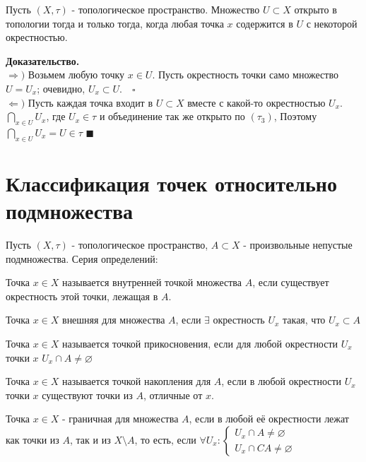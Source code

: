 \begin{theorem}
    Пусть $(X,\tau)$ - топологическое пространство. Множество $U{\subset}X$ открыто в топологии тогда и только тогда, когда любая точка $x$ содержится в $U$ с некоторой окрестностью. 

\textbf{Доказательство.}\\ $\Rightarrow)$ Возьмем любую точку $x\in U$. Пусть окрестность
точки само множество $U=U_x$; очевидно,  $U_x\subset U$.\ \ $\square$\\
$\Leftarrow)$ Пусть каждая точка входит в $U{\subset}X$ вместе с какой-то окрестностью $U_x$. $\bigcap\limits_{x{\in}U} U_x$, где $U_x{\in}\tau$ и объединение так же открыто по $(\tau_3)$, Поэтому $\bigcap\limits_{x{\in}U} U_x=U{\in}\tau$ $\blacksquare$ 
\end{theorem}
\section{Классификация точек относительно подмножества}
Пусть $(X,\tau)$ - топологическое пространство, $A\subset X$ - произвольные непустые подмножества. Серия определений:
\begin{definition}
Точка $x\in X$ называется внутренней точкой множества  $A$, если существует окрестность этой точки, лежащая в $A$.
\end{definition}
\begin{definition}
Точка $x\in X$ внешняя для множества $A$, если $\exists$ окрестность $U_x$ такая, что $U_x{\subset}A$
\end{definition}
\begin{definition}
Точка $x\in X$ называется точкой прикосновения, если для любой окрестности $U_x$ точки $x$ $U_x\cap A\neq\varnothing$
\end{definition}
\begin{definition}
Точка $x\in X$ называется точкой накопления для $A$, если в любой окрестности $U_x$ точки $x$ существуют точки из $A$, отличные от $x$. 
\end{definition}
\begin{definition}
Точка $x\in X$ - граничная для множества $A$, если в любой её окрестности лежат как точки из $A$, так и из $X\setminus A$, то есть, если $\forall U_x: \begin{cases}
U_x{\cap}A\neq\varnothing\\
U_x{\cap}CA\neq\varnothing
\end{cases}$ 
\end{definition}
